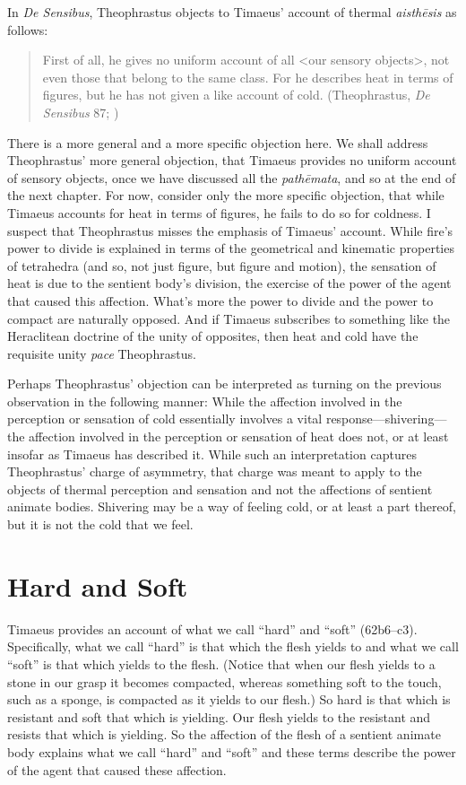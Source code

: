 In \emph{De Sensibus}, Theophrastus objects to Timaeus' account of thermal \emph{aisthēsis} as follows:
\begin{quote}
	First of all, he gives no uniform account of all <our sensory objects>, not even those that belong to the same class. For he describes heat in terms of figures, but he has not given a like account of cold. (Theophrastus, \emph{De Sensibus} 87; \citealt[147]{Stratton:1917vn})
\end{quote}
There is a more general and a more specific objection here. We shall address Theophrastus' more general objection, that Timaeus provides no uniform account of sensory objects, once we have discussed all the \emph{pathēmata}, and so at the end of the next chapter. For now, consider only the more specific objection, that while Timaeus accounts for heat in terms of figures, he fails to do so for coldness. I suspect that Theophrastus misses the emphasis of Timaeus' account. While fire's power to divide is explained in terms of the geometrical and kinematic properties of tetrahedra (and so, not just figure, but figure and motion), the sensation of heat is due to the sentient body's division, the exercise of the power of the agent that caused this affection. What's more the power to divide and the power to compact are naturally opposed. And if Timaeus subscribes to something like the Heraclitean doctrine of the unity of opposites, then heat and cold have the requisite unity \emph{pace} Theophrastus. 

Perhaps Theophrastus' objection can be interpreted as turning on the previous observation in the following manner: While the affection involved in the perception or sensation of cold essentially involves a vital response---shivering---the affection involved in the perception or sensation of heat does not, or at least insofar as Timaeus has described it. While such an interpretation captures Theophrastus' charge of asymmetry, that charge was meant to apply to the objects of thermal perception and sensation and not the affections of sentient animate bodies. Shivering may be a way of feeling cold, or at least a part thereof, but it is not the cold that we feel.


\section{Hard and Soft} %
\label{sec:hard_and_soft}

Timaeus provides an account of what we call ``hard'' and ``soft'' (62b6--c3). Specifically, what we call ``hard'' is that which the flesh yields to and what we call ``soft'' is that which yields to the flesh. (Notice that when our flesh yields to a stone in our grasp it becomes compacted, whereas something soft to the touch, such as a sponge, is compacted as it yields to our flesh.) So hard is that which is resistant and soft that which is yielding. Our flesh yields to the resistant and resists that which is yielding. So the affection of the flesh of a sentient animate body explains what we call ``hard'' and ``soft'' and these terms describe the power of the agent that caused these affection.


